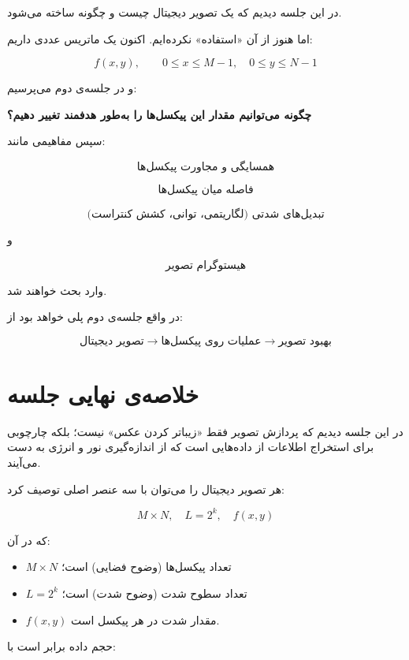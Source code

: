 \documentclass[11pt,a4paper]{article}
\begin{document}
	در این جلسه دیدیم که یک تصویر دیجیتال چیست و چگونه ساخته می‌شود.
	
	اما هنوز از آن «استفاده» نکرده‌ایم. اکنون یک ماتریس عددی داریم:
	
	\[
	\boxed{
		f(x,y),\qquad 0\leq x\leq M-1,\quad 0\leq y\leq N-1
	}
	\]
	
	و در جلسه‌ی دوم می‌پرسیم:
	
	\begin{center}
		\Large
		\textbf{چگونه می‌توانیم مقدار این پیکسل‌ها را به‌طور هدفمند تغییر دهیم؟}
	\end{center}
	
	سپس مفاهیمی مانند:
	
	\[
	\text{همسایگی و مجاورت پیکسل‌ها}
	\]
	
	\[
	\text{فاصله میان پیکسل‌ها}
	\]
	
	\[
	\text{تبدیل‌های شدتی (لگاریتمی، توانی، کشش کنتراست)}
	\]
	
	و
	
	\[
	\text{هیستوگرام تصویر}
	\]
	
	وارد بحث خواهند شد.
	
	در واقع جلسه‌ی دوم پلی خواهد بود از:
	
	\[
	\boxed{
		\text{تصویر دیجیتال}
		\longrightarrow
		\text{عملیات روی پیکسل‌ها}
		\longrightarrow
		\text{بهبود تصویر}
	}
	\]
	
	
	\section{خلاصه‌ی نهایی جلسه}
	
	در این جلسه دیدیم که پردازش تصویر فقط «زیباتر کردن عکس» نیست؛ بلکه
	چارچوبی برای استخراج اطلاعات از داده‌هایی است که از اندازه‌گیری نور و انرژی به دست می‌آیند.
	
	هر تصویر دیجیتال را می‌توان با سه عنصر اصلی توصیف کرد:
	
	\[
	\boxed{
		M\times N,
		\quad
		L=2^{k},
		\quad
		f(x,y)
	}
	\]
	
	که در آن:
	
	\begin{itemize}
		\item $M\times N$ تعداد پیکسل‌ها (وضوح فضایی) است؛
		\item $L=2^k$ تعداد سطوح شدت (وضوح شدت) است؛
		\item $f(x,y)$ مقدار شدت در هر پیکسل است.
	\end{itemize}
	
	حجم داده برابر است با:
	
\end{document}
